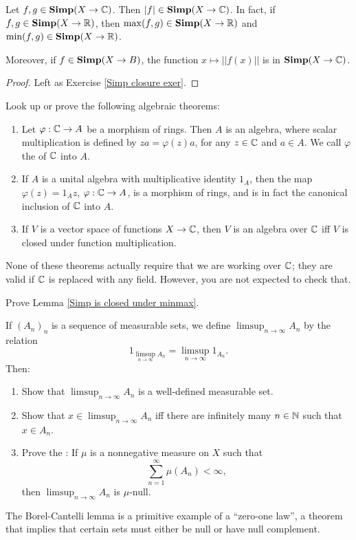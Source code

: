 \begin{lemma}
\label{Simp is closed under minmax}
Let $f, g \in \mathbf{Simp}(X \to \mathbb{C})$. Then $|f| \in \mathbf{Simp}(X \to \mathbb{C})$. In fact, if $f, g \in \mathbf{Simp}(X \to \mathbb{R})$, then $\max(f, g) \in \mathbf{Simp}(X \to \mathbb{R})$ and $\min(f, g) \in \mathbf{Simp}(X \to \mathbb{R})$.

Moreover, if $f \in \mathbf{Simp}(X \to B)$, the function $x \mapsto ||f(x)||$ is in $\mathbf{Simp}(X \to \mathbb{C})$.
\end{lemma}
\begin{proof}
Left as Exercise \ref{Simp closure exer}.
\end{proof}

\begin{exercise}
\label{algebra review}
Look up or prove the following algebraic theorems:
\begin{enumerate}
\item Let $\varphi: \mathbb{C} \to A$ be a morphism of rings. Then $A$ is an algebra, where scalar multiplication is defined by $za = \varphi(z)a$, for any $z \in \mathbb{C}$ and $a \in A$. We call $\varphi$ the  of $\mathbb{C}$ into $A$.
\item If $A$ is a unital algebra with multiplicative identity $1_A$, then the map $\varphi(z) = 1_Az$, $\varphi: \mathbb{C} \to A$, is a morphism of rings, and is in fact the canonical inclusion of $\mathbb{C}$ into $A$.
\item If $V$ is a vector space of functions $X \to \mathbb{C}$, then $V$ is an algebra over $\mathbb{C}$ iff $V$ is closed under function multiplication.
\end{enumerate}
None of these theorems actually require that we are working over $\mathbb{C}$; they are valid if $\mathbb{C}$ is replaced with any field.
However, you are not expected to check that.
\end{exercise}

\begin{exercise}
\label{Simp closure exer}
Prove Lemma \ref{Simp is closed under minmax}.
\end{exercise}

\begin{exercise}
\label{Borel-Cantelli}
If $(A_{n})_{n}$ is a sequence of measurable sets, we define $\limsup_{n \to \infty} A_{n}$ by the relation
\[1_{\limsup_{n \to \infty} A_{n}} = \limsup_{n \to \infty} 1_{A_{n}}.\]
Then:
\begin{enumerate}
\item Show that $\limsup_{n \to \infty} A_{n}$ is a well-defined measurable set.
\item Show that $x \in \limsup_{n \to \infty} A_{n}$ iff there are infinitely many $n \in \mathbb{N}$ such that $x \in A_{n}$.
\item Prove the : If $\mu$ is a nonnegative measure on $X$ such that
\[\sum_{n=1}^{\infty} \mu(A_{n}) < \infty,\]
then $\limsup_{n \to \infty} A_{n}$ is $\mu$-null.
\end{enumerate}
The Borel-Cantelli lemma is a primitive example of a ``zero-one law'', a theorem that implies that certain sets must either be null or have null complement.
\end{exercise}

